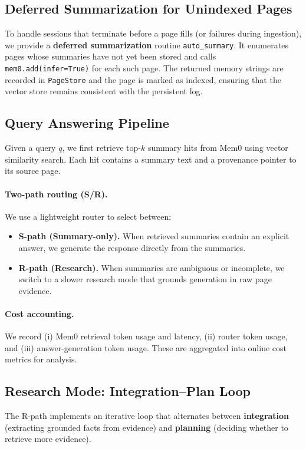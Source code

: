 \documentclass{article}
\theoremstyle{plain}
\theoremstyle{definition}
\theoremstyle{remark}
\begin{document}
\subsection{Deferred Summarization for Unindexed Pages}
\label{app:auto_summary}
To handle sessions that terminate before a page fills (or failures during ingestion), we provide a \textbf{deferred summarization} routine \texttt{auto\_summary}. It enumerates pages whose summaries have not yet been stored and calls \texttt{mem0.add(infer=True)} for each such page. The returned memory strings are recorded in \texttt{PageStore} and the page is marked as indexed, ensuring that the vector store remains consistent with the persistent log.

\subsection{Query Answering Pipeline}
\label{app:qa_pipeline}
Given a query $q$, we first retrieve top-$k$ summary hits from Mem0 using vector similarity search. Each hit contains a summary text and a provenance pointer to its source page.

\paragraph{Two-path routing (S/R).}
We use a lightweight router to select between:
\begin{itemize}
    \item \textbf{S-path (Summary-only).} When retrieved summaries contain an explicit answer, we generate the response directly from the summaries.
    \item \textbf{R-path (Research).} When summaries are ambiguous or incomplete, we switch to a slower research mode that grounds generation in raw page evidence.
\end{itemize}

\paragraph{Cost accounting.}
We record (i) Mem0 retrieval token usage and latency, (ii) router token usage, and (iii) answer-generation token usage. These are aggregated into online cost metrics for analysis.

\subsection{Research Mode: Integration--Plan Loop }
\label{app:research_v2}
The R-path implements an iterative loop that alternates between \textbf{integration} (extracting grounded facts from evidence) and \textbf{planning} (deciding whether to retrieve more evidence).
\end{document}
